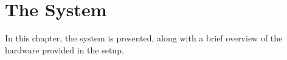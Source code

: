 \chapter{The System}
In this chapter, the system is presented, along with a brief overview of the hardware provided in the setup.